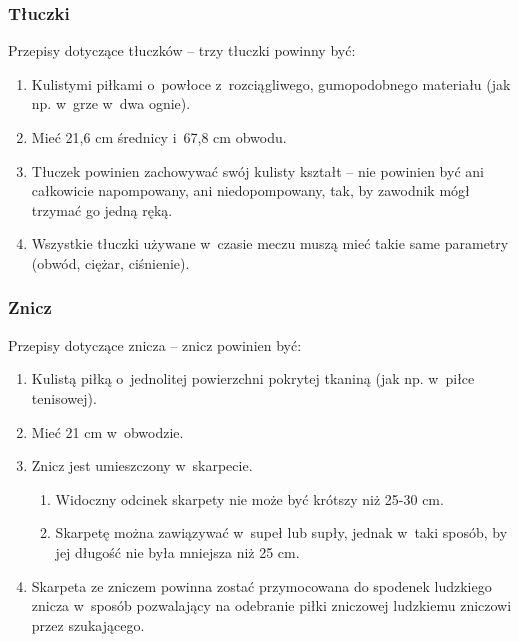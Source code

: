 \documentclass[12pt,a4paper]{article}
\begin{document}
\subsubsection{Tłuczki}
Przepisy dotyczące tłuczków -- trzy tłuczki powinny być:

\begin{enumerate}
	\item Kulistymi piłkami o~powłoce z~rozciągliwego, gumopodobnego materiału
	      (jak np. w~grze w~dwa ognie).

	\item Mieć 21,6 cm średnicy i~67,8 cm obwodu.

	\item Tłuczek powinien zachowywać swój kulisty kształt -- nie powinien być
	      ani całkowicie napompowany, ani niedopompowany, tak, by zawodnik mógł
	      trzymać go jedną ręką.

	\item Wszystkie tłuczki używane w~czasie meczu muszą mieć takie same
	      parametry (obwód, ciężar, ciśnienie).
\end{enumerate}

\subsubsection{Znicz}
Przepisy dotyczące znicza -- znicz powinien być:

\begin{enumerate}
	\item Kulistą piłką o~jednolitej powierzchni pokrytej tkaniną (jak np. w~piłce tenisowej).

	\item Mieć 21 cm w~obwodzie.

	\item Znicz jest umieszczony w~skarpecie.
	      \begin{enumerate}
		      \item Widoczny odcinek skarpety nie może być krótszy niż 25-30 cm.

		      \item Skarpetę można zawiązywać w~supeł lub supły, jednak w~taki sposób,
		            by jej długość nie była mniejsza niż 25 cm.
	      \end{enumerate}
	\item Skarpeta ze zniczem powinna zostać przymocowana do spodenek ludzkiego
	      znicza w~sposób pozwalający na odebranie piłki zniczowej ludzkiemu
	      zniczowi przez szukającego.
\end{enumerate}
\end{document}

